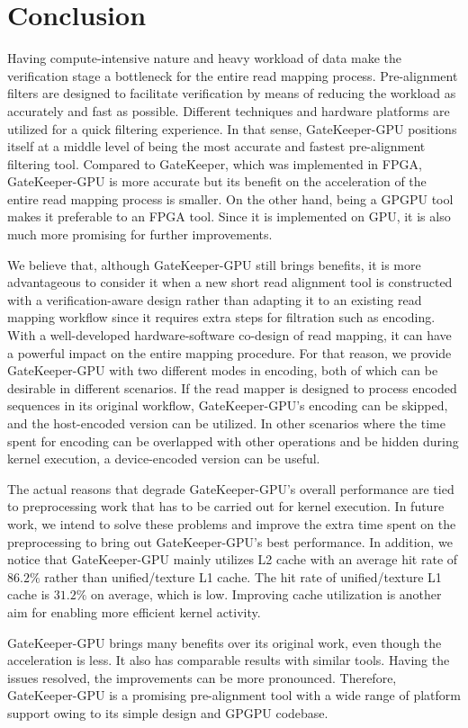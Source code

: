 \section{Conclusion}
Having compute-intensive nature and heavy workload of data make the verification stage a bottleneck for the entire read mapping process. Pre-alignment filters are designed to facilitate verification by means of reducing the workload as accurately and fast as possible. Different techniques and hardware platforms are utilized for a quick filtering experience. In that sense, GateKeeper-GPU positions itself at a middle level of being the most accurate and fastest pre-alignment filtering tool. Compared to GateKeeper, which was implemented in FPGA, GateKeeper-GPU is more accurate but its benefit on the acceleration of the entire read mapping process is smaller. On the other hand, being a GPGPU tool makes it preferable to an FPGA tool. Since it is implemented on GPU, it is also much more promising for further improvements. 

We believe that, although GateKeeper-GPU still brings benefits, it is more advantageous to consider it when a new short read alignment tool is constructed with a verification-aware design rather than adapting it to an existing read mapping workflow since it requires extra steps for filtration such as encoding. With a well-developed hardware-software co-design of read mapping, it can have a powerful impact on the entire mapping procedure. For that reason, we provide GateKeeper-GPU with two different modes in encoding, both of which can be desirable in different scenarios. If the read mapper is designed to process encoded sequences in its original workflow, GateKeeper-GPU's encoding can be skipped, and the host-encoded version can be utilized. In other scenarios where the time spent for encoding can be overlapped with other operations and be hidden during kernel execution, a device-encoded version can be useful. 

The actual reasons that degrade GateKeeper-GPU's overall performance are tied to preprocessing work that has to be carried out for kernel execution. In future work, we intend to solve these problems and improve the extra time spent on the preprocessing to bring out GateKeeper-GPU's best performance. In addition, we notice that GateKeeper-GPU mainly utilizes L2 cache with an average hit rate of $86.2\%$ rather than unified/texture L1 cache. The hit rate of unified/texture L1 cache is $31.2\%$ on average, which is low. Improving cache utilization is another aim for enabling more efficient kernel activity. 

GateKeeper-GPU brings many benefits over its original work, even though the acceleration is less. It also has comparable results with similar tools. Having the issues resolved, the improvements can be more pronounced. Therefore, GateKeeper-GPU is a promising pre-alignment tool with a wide range of platform support owing to its simple design and GPGPU codebase.